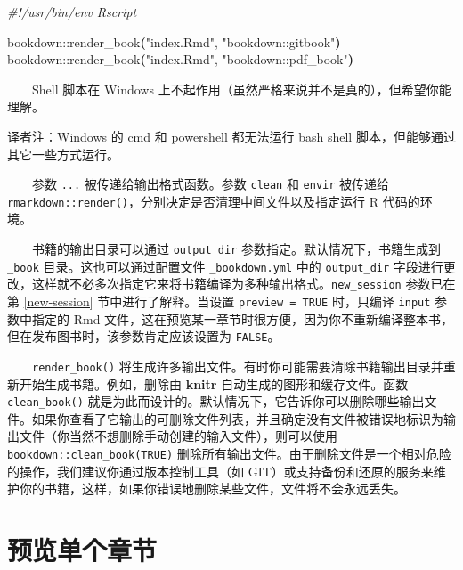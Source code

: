 \documentclass[
  12pt,
]{krantz}
\newenvironment{Shaded}{\begin{snugshade}}{\end{snugshade}}
\newcommand{\CommentTok}[1]{\textcolor[rgb]{0.56,0.35,0.01}{\textit{#1}}}
\newcommand{\ErrorTok}[1]{\textcolor[rgb]{0.64,0.00,0.00}{\textbf{#1}}}
\newcommand{\ExtensionTok}[1]{#1}
\newcommand{\KeywordTok}[1]{\textcolor[rgb]{0.13,0.29,0.53}{\textbf{#1}}}
\newcommand{\StringTok}[1]{\textcolor[rgb]{0.31,0.60,0.02}{#1}}
\renewenvironment{quote}{\begin{VF}}{\end{VF}}
\theoremstyle{definition}
\theoremstyle{definition}
\theoremstyle{definition}
\theoremstyle{definition}
\theoremstyle{remark}
\begin{document}
\begin{Shaded}
\begin{Highlighting}[]
\CommentTok{\#!/usr/bin/env Rscript}

\ExtensionTok{bookdown::render\_book}\ErrorTok{(}\StringTok{"index.Rmd"}\ExtensionTok{,} \StringTok{"bookdown::gitbook"}\KeywordTok{)}
\ExtensionTok{bookdown::render\_book}\ErrorTok{(}\StringTok{"index.Rmd"}\ExtensionTok{,} \StringTok{"bookdown::pdf\_book"}\KeywordTok{)}
\end{Highlighting}
\end{Shaded}

  Shell 脚本在 Windows 上不起作用（虽然严格来说并不是真的），但希望你能理解。

\begin{quote}
译者注：Windows 的 cmd 和 powershell 都无法运行 bash shell 脚本，但能够通过其它一些方式运行。
\end{quote}

  参数 \texttt{...} 被传递给输出格式函数。参数 \texttt{clean} 和 \texttt{envir} 被传递给 \texttt{rmarkdown::render()}，分别决定是否清理中间文件以及指定运行 R 代码的环境。

  书籍的输出目录可以通过 \texttt{output\_dir} 参数指定。默认情况下，书籍生成到 \texttt{\_book} 目录。这也可以通过配置文件 \texttt{\_bookdown.yml} 中的 \texttt{output\_dir} 字段进行更改，这样就不必多次指定它来将书籍编译为多种输出格式。\texttt{new\_session} 参数已在第 \ref{new-session} 节中进行了解释。当设置 \texttt{preview\ =\ TRUE} 时，只编译 \texttt{input} 参数中指定的 Rmd 文件，这在预览某一章节时很方便，因为你不重新编译整本书，但在发布图书时，该参数肯定应该设置为 \texttt{FALSE}。

  \texttt{render\_book()} 将生成许多输出文件。有时你可能需要清除书籍输出目录并重新开始生成书籍。例如，删除由 \textbf{knitr} 自动生成的图形和缓存文件。函数 \texttt{clean\_book()} 就是为此而设计的。默认情况下，它告诉你可以删除哪些输出文件。如果你查看了它输出的可删除文件列表，并且确定没有文件被错误地标识为输出文件（你当然不想删除手动创建的输入文件），则可以使用 \texttt{bookdown::clean\_book(TRUE)} 删除所有输出文件。由于删除文件是一个相对危险的操作，我们建议你通过版本控制工具（如 GIT）或支持备份和还原的服务来维护你的书籍，这样，如果你错误地删除某些文件，文件将不会永远丢失。

\hypertarget{ux9884ux89c8ux5355ux4e2aux7ae0ux8282}{%
\section{预览单个章节}\label{ux9884ux89c8ux5355ux4e2aux7ae0ux8282}}
\end{document}
